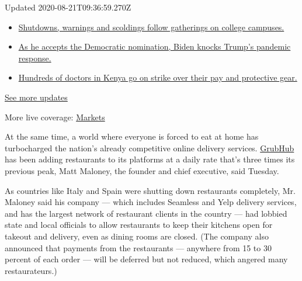 Updated 2020-08-21T09:36:59.270Z

\begin{itemize}
\tightlist
\item
  \href{https://www.nytimes3xbfgragh.onion/2020/08/21/world/covid-19-coronavirus.html?action=click\&pgtype=Article\&state=default\&region=MAIN_CONTENT_1\&context=storylines_live_updates\#link-4690b6aa}{Shutdowns,
  warnings and scoldings follow gatherings on college campuses.}
\item
  \href{https://www.nytimes3xbfgragh.onion/2020/08/21/world/covid-19-coronavirus.html?action=click\&pgtype=Article\&state=default\&region=MAIN_CONTENT_1\&context=storylines_live_updates\#link-324af071}{As
  he accepts the Democratic nomination, Biden knocks Trump's pandemic
  response.}
\item
  \href{https://www.nytimes3xbfgragh.onion/2020/08/21/world/covid-19-coronavirus.html?action=click\&pgtype=Article\&state=default\&region=MAIN_CONTENT_1\&context=storylines_live_updates\#link-35890b73}{Hundreds
  of doctors in Kenya go on strike over their pay and protective gear.}
\end{itemize}

\href{https://www.nytimes3xbfgragh.onion/2020/08/21/world/covid-19-coronavirus.html?action=click\&pgtype=Article\&state=default\&region=MAIN_CONTENT_1\&context=storylines_live_updates}{See
more updates}

More live coverage:
\href{https://www.nytimes3xbfgragh.onion/live/2020/08/20/business/stock-market-today-coronavirus?action=click\&pgtype=Article\&state=default\&region=MAIN_CONTENT_1\&context=storylines_live_updates}{Markets}

At the same time, a world where everyone is forced to eat at home has
turbocharged the nation's already competitive online delivery services.
\href{https://www.barrons.com/articles/grubhub-stock-nyc-food-delivery-market-coronavirus-51584381819}{GrubHub}
has been adding restaurants to its platforms at a daily rate that's
three times its previous peak, Matt Maloney, the founder and chief
executive, said Tuesday.

As countries like Italy and Spain were shutting down restaurants
completely, Mr. Maloney said his company --- which includes Seamless and
Yelp delivery services, and has the largest network of restaurant
clients in the country --- had lobbied state and local officials to
allow restaurants to keep their kitchens open for takeout and delivery,
even as dining rooms are closed. (The company also announced that
payments from the restaurants --- anywhere from 15 to 30 percent of each
order --- will be deferred but not reduced, which angered many
restaurateurs.)

